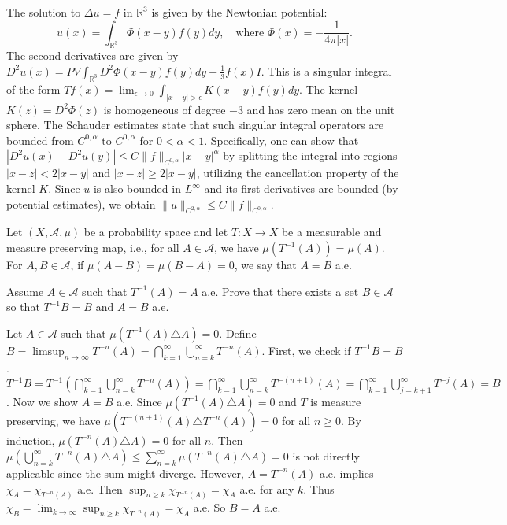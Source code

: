 \begin{solution}
The solution to $\Delta u = f$ in $\mathbb{R}^3$ is given by the Newtonian potential:
\[
u(x) = \int_{\mathbb{R}^3} \Phi(x-y) f(y) dy, \quad \text{where } \Phi(x) = -\frac{1}{4\pi|x|}.
\]
The second derivatives are given by $D^2 u(x) = PV \int_{\mathbb{R}^3} D^2 \Phi(x-y) f(y) dy + \frac{1}{3} f(x) I$.
This is a singular integral of the form $Tf(x) = \lim_{\epsilon \to 0} \int_{|x-y|>\epsilon} K(x-y) f(y) dy$. The kernel $K(z) = D^2 \Phi(z)$ is homogeneous of degree $-3$ and has zero mean on the unit sphere.
The Schauder estimates state that such singular integral operators are bounded from $C^{0,\alpha}$ to $C^{0,\alpha}$ for $0 < \alpha < 1$.
Specifically, one can show that $|D^2 u(x) - D^2 u(y)| \leq C \|f\|_{C^{0,\alpha}} |x-y|^\alpha$ by splitting the integral into regions $|x-z| < 2|x-y|$ and $|x-z| \geq 2|x-y|$, utilizing the cancellation property of the kernel $K$. Since $u$ is also bounded in $L^\infty$ and its first derivatives are bounded (by potential estimates), we obtain $\|u\|_{C^{2,\alpha}} \leq C \|f\|_{C^{0,\alpha}}$.
\end{solution}

\begin{exercise}
\label{analysis:2019:8}
Let $(X,\mathcal{A},\mu)$ be a probability space and let $T:X\to X$ be a measurable and measure preserving map, i.e., for all $A\in\mathcal{A}$, we have $\mu(T^{-1}(A))=\mu(A)$. For $A,B\in\mathcal{A}$, if $\mu(A-B)=\mu(B-A)=0$, we say that $A=B$ a.e.

Assume $A\in\mathcal{A}$ such that $T^{-1}(A)=A$ a.e. Prove that there exists a set $B\in\mathcal{A}$ so that $T^{-1}B=B$ and $A=B$ a.e.
\end{exercise}

\begin{solution}
Let $A \in \mathcal{A}$ such that $\mu(T^{-1}(A) \triangle A) = 0$.
Define $B = \limsup_{n \to \infty} T^{-n}(A) = \bigcap_{k=1}^\infty \bigcup_{n=k}^\infty T^{-n}(A)$.
First, we check if $T^{-1}B = B$.
$T^{-1}B = T^{-1} \left( \bigcap_{k=1}^\infty \bigcup_{n=k}^\infty T^{-n}(A) \right) = \bigcap_{k=1}^\infty \bigcup_{n=k}^\infty T^{-(n+1)}(A) = \bigcap_{k=1}^\infty \bigcup_{j=k+1}^\infty T^{-j}(A) = B$.
Now we show $A = B$ a.e.
Since $\mu(T^{-1}(A) \triangle A) = 0$ and $T$ is measure preserving, we have $\mu(T^{-(n+1)}(A) \triangle T^{-n}(A)) = 0$ for all $n \geq 0$.
By induction, $\mu(T^{-n}(A) \triangle A) = 0$ for all $n$.
Then $\mu( \bigcup_{n=k}^\infty T^{-n}(A) \triangle A ) \leq \sum_{n=k}^\infty \mu(T^{-n}(A) \triangle A) = 0$ is not directly applicable since the sum might diverge.
However, $A = T^{-n}(A)$ a.e. implies $\chi_A = \chi_{T^{-n}(A)}$ a.e.
Then $\sup_{n \geq k} \chi_{T^{-n}(A)} = \chi_A$ a.e. for any $k$.
Thus $\chi_B = \lim_{k \to \infty} \sup_{n \geq k} \chi_{T^{-n}(A)} = \chi_A$ a.e.
So $B = A$ a.e.
\end{solution}

